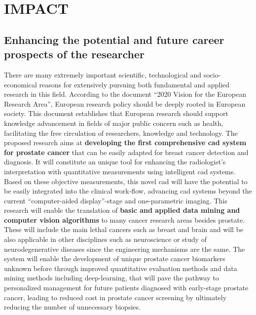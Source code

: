 \section{IMPACT}
\label{sec:impact}

\subsection{Enhancing the potential and future career prospects of the researcher}
\label{sec:enhancement}

There are many extremely important scientific, technological and socio-economical reasons for extensively pursuing both fundamental and applied research in this field.
According to the document ``2020 Vision for the European Research Area'', European research policy should be deeply rooted in European society.
This document establishes that European research should support knowledge advancement in fields of major public concern such as health, facilitating the free circulation of researchers, knowledge and technology.
The proposed research aims at \textbf{developing the first comprehensive \ac{cad} system for prostate cancer} that can be easily adapted for breast cancer detection and diagnosis.
It will constitute an unique tool for enhancing the radiologist's interpretation with quantitative measurements using intelligent \ac{cad} systems.
Based on these objective measurements, this novel \ac{cad} will have the potential to be easily integrated into the clinical work-flow, advancing \ac{cad} systems beyond the current ``computer-aided display''-stage and one-parametric imaging.
This research will enable the translation of \textbf{basic and applied data mining and computer vision algorithms} to many cancer research areas besides prostate. 
These will include the main lethal cancers such as breast and brain and will be also applicable in other disciplines such as neuroscience or study of neurodegenerative diseases since the engineering mechanisms are the same.
The system will enable the development of unique prostate cancer biomarkers unknown before through improved quantitative evaluation methods and data mining methods including deep-learning, that will pave the pathway to personalized management for future patients diagnosed with early-stage prostate cancer, leading to reduced cost in prostate cancer screening by ultimately reducing the number of unnecessary biopsies.

